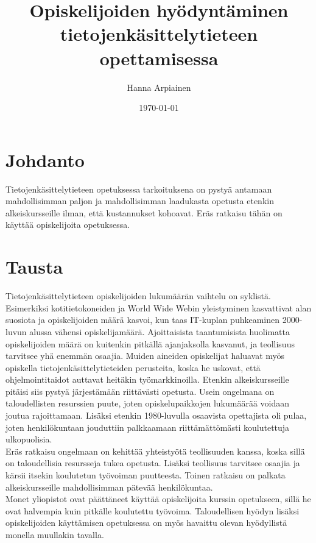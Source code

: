 \documentclass[finnish]{tktltiki2}
\title{﻿Opiskelijoiden hyödyntäminen tietojenkäsittelytieteen opettamisessa}
\author{Hanna Arpiainen}
\date{\today}
\theoremstyle{definition}
\theoremstyle{remark}
\begin{document}
\maketitle
\makeabstract

\tableofcontents
\newpage



\section{Johdanto}
Tietojenkäsittelytieteen opetuksessa tarkoituksena on pystyä antamaan mahdollisimman paljon ja mahdollisimman laadukasta opetusta etenkin alkeiskursseille ilman, että kustannukset kohoavat. Eräs ratkaisu tähän on käyttää opiskelijoita opetuksessa.



\section{Tausta}
Tietojenkäsittelytieteen opiskelijoiden lukumäärän vaihtelu on syklistä.\cite{Roberts11} Esimerkiksi kotitietokoneiden ja World Wide Webin yleistyminen kasvattivat alan suosiota ja opiskelijoiden määrä kasvoi, kun taas IT-kuplan puhkeaminen 2000-luvun alussa vähensi opiskelijamäärä. Ajoittaisista taantumisista huolimatta opiskelijoiden määrä on kuitenkin pitkällä ajanjaksolla kasvanut, ja teollisuus tarvitsee yhä enemmän osaajia. Muiden aineiden opiskelijat haluavat myös opiskella tietojenkäsittelytieteiden perusteita, koska he uskovat, että ohjelmointitaidot auttavat heitäkin työmarkkinoilla. Etenkin alkeiskursseille pitäisi siis pystyä järjestämään riittävästi opetusta. 
Usein ongelmana on taloudellisten resurssien puute, joten opiskelupaikkojen lukumäärää voidaan joutua rajoittamaan. Lisäksi etenkin 1980-luvulla osaavista opettajista oli pulaa, joten henkilökuntaan jouduttiin palkkaamaan riittämättömästi koulutettuja ulkopuolisia.
\\
Eräs ratkaisu ongelmaan on kehittää yhteistyötä teollisuuden kanssa, koska sillä on taloudellisia resursseja tukea opetusta. Lisäksi teollisuus tarvitsee osaajia ja kärsii itsekin koulutetun työvoiman puutteesta. Toinen ratkaisu on palkata alkeiskursseille mahdollisimman pätevää henkilökuntaa.
\\
Monet yliopistot ovat päättäneet käyttää opiskelijoita kurssin opetukseen, sillä he ovat halvempia kuin pitkälle koulutettu työvoima. Taloudellisen hyödyn lisäksi opiskelijoiden käyttämisen opetuksessa on myös havaittu olevan hyödyllistä monella muullakin tavalla.
\end{document}
